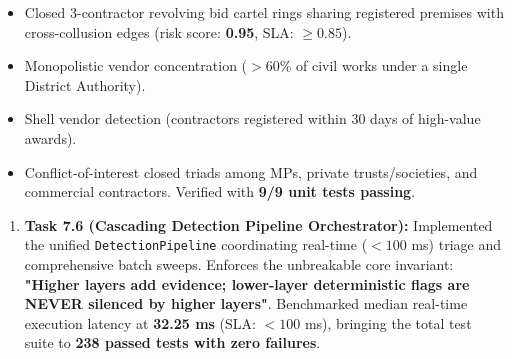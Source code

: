 \documentclass[11pt,a4paper]{article}
\begin{document}
\begin{itemize}[leftmargin=1.5em, itemsep=2pt, topsep=3pt]
\item Closed 3-contractor revolving bid cartel rings sharing registered premises with cross-collusion edges (risk score: \textbf{0.95}, SLA: $\ge 0.85$).
\item Monopolistic vendor concentration ($> 60\%$ of civil works under a single District Authority).
\item Shell vendor detection (contractors registered within 30 days of high-value awards).
\item Conflict-of-interest closed triads among MPs, private trusts/societies, and commercial contractors. Verified with \textbf{9/9 unit tests passing}.
\end{itemize}
\begin{enumerate}[leftmargin=1.5em, itemsep=2pt, topsep=3pt]
\item \textbf{Task 7.6 (Cascading Detection Pipeline Orchestrator):} Implemented the unified \texttt{DetectionPipeline} coordinating real-time ($< 100$ ms) triage and comprehensive batch sweeps. Enforces the unbreakable core invariant: \textbf{"Higher layers add evidence; lower-layer deterministic flags are NEVER silenced by higher layers"}. Benchmarked median real-time execution latency at \textbf{32.25 ms} (SLA: $< 100$ ms), bringing the total test suite to \textbf{238 passed tests with zero failures}.
\end{enumerate}
\end{document}
